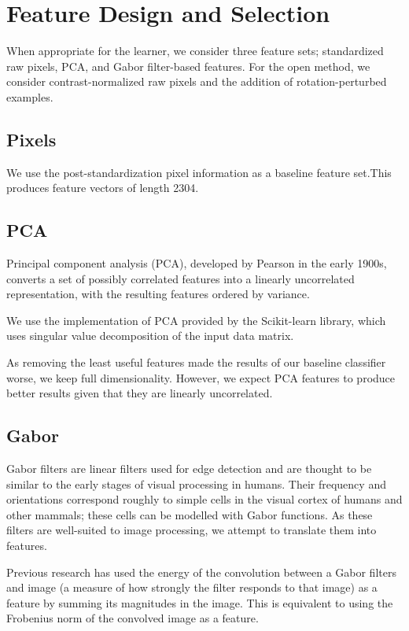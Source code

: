 \documentclass{acm_proc_article-sp}
\begin{document}
\section{Feature Design and Selection}
When appropriate for the learner, we consider three feature sets; standardized raw pixels, PCA, and Gabor filter-based features. For the open method, we consider contrast-normalized raw pixels and the addition of rotation-perturbed examples.

\subsection{Pixels}
We use the post-standardization pixel information as a baseline feature set.This produces feature vectors of length 2304. 

\subsection{PCA}
Principal component analysis (PCA), developed by Pearson in the early 1900s\cite{Pearson}, converts a set of possibly correlated features into a linearly uncorrelated representation, with the resulting features ordered by variance. 

We use the implementation of PCA provided by the Scikit-learn library\cite{scikit-learn}, which uses singular value decomposition of the input data matrix.

As removing the least useful features made the results of our baseline classifier worse, we keep full dimensionality. However, we expect PCA features to produce better results given that they are linearly uncorrelated.

\subsection{Gabor}
Gabor filters are linear filters used for edge detection and are thought to be similar to the early stages of visual processing in humans. Their frequency and orientations correspond roughly to simple cells in the visual cortex of humans and other mammals; these cells can be modelled with Gabor functions.\cite{Jones}\cite{Marvcelja} As these filters are well-suited to image processing, we attempt to translate them into features.

Previous research has used the energy of the convolution between a Gabor filters and image (a measure of how strongly the filter responds to that image\cite{Grigorescu}) as a feature by summing its magnitudes in the image.\cite{Bau} This is equivalent to using the Frobenius norm of the convolved image as a feature. 
\end{document}
